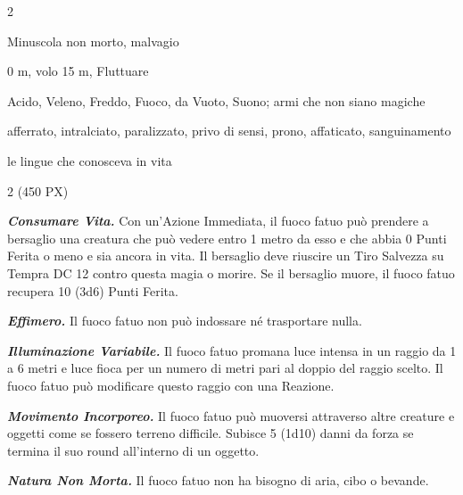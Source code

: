 \begin{multicols}{2}
{
\begin{description}[noitemsep, topsep=0pt, parsep=0pt, partopsep=0pt, itemsep=1pt, leftmargin=2.35cm,  labelwidth=2.2cm, itemindent=0cm, listparindent=0pt] %
\setlength{\baselineskip}{10pt}
\item[\textbf{Taglia/Tipo}] Minuscola non morto, malvagio
\item[\textbf{Caratt.}] 
\item[\textbf{Punti Ferita}] 
\item[\textbf{Movimento}] 0 m, volo 15 m, Fluttuare
\item[\textbf{Tiri Salvez.}] 
\item[\textbf{Res. Danni}] Acido, Veleno, Freddo, Fuoco, da Vuoto, Suono; armi che non siano magiche
\item[\textbf{Immunità}] afferrato, intralciato, paralizzato, privo di sensi, prono, affaticato, sanguinamento
\item[\textbf{Sensi}] 
\item[\textbf{Linguaggi}] le lingue che conosceva in vita
\item[\textbf{Sfida}] 2 (450 PX)
\end{description}
\smallskip

\emph{\textbf{Consumare Vita.}} Con un'Azione Immediata, il fuoco fatuo può prendere a bersaglio una creatura che può vedere entro 1 metro da esso e che abbia 0 Punti Ferita o meno e sia ancora in vita. Il bersaglio deve riuscire un Tiro Salvezza su Tempra DC 12 contro questa magia o morire. Se il bersaglio muore, il fuoco fatuo recupera 10 (3d6) Punti Ferita.

\emph{\textbf{Effimero.}} Il fuoco fatuo non può indossare né trasportare nulla.

\emph{\textbf{Illuminazione Variabile.}} Il fuoco fatuo promana luce intensa in un raggio da 1 a 6 metri e luce fioca per un numero di metri pari al doppio del raggio scelto. Il fuoco fatuo può modificare questo raggio con una Reazione.

\emph{\textbf{Movimento Incorporeo.}} Il fuoco fatuo può muoversi attraverso altre creature e oggetti come se fossero terreno difficile. Subisce 5 (1d10) danni da forza se termina il suo round all'interno di un oggetto.

\emph{\textbf{Natura Non Morta.}} Il fuoco fatuo non ha bisogno di aria, cibo o bevande.

}
\end{multicols}
